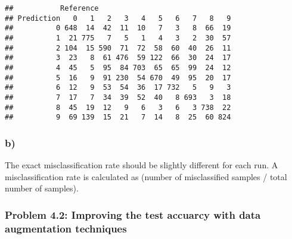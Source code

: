 \documentclass[
]{article}
\newenvironment{Shaded}{\begin{snugshade}}{\end{snugshade}}
\newcommand{\FunctionTok}[1]{\textcolor[rgb]{0.00,0.00,0.00}{#1}}
\newcommand{\NormalTok}[1]{#1}
\newcommand{\OtherTok}[1]{\textcolor[rgb]{0.56,0.35,0.01}{#1}}
\newcommand{\SpecialCharTok}[1]{\textcolor[rgb]{0.00,0.00,0.00}{#1}}
\begin{document}
\begin{Shaded}
\end{Shaded}

\begin{verbatim}
##           Reference
## Prediction   0   1   2   3   4   5   6   7   8   9
##          0 648  14  42  11  10   7   3   8  66  19
##          1  21 775   7   5   1   4   3   2  30  57
##          2 104  15 590  71  72  58  60  40  26  11
##          3  23   8  61 476  59 122  66  30  24  17
##          4  45   5  95  84 703  65  65  99  24  12
##          5  16   9  91 230  54 670  49  95  20  17
##          6  12   9  53  54  36  17 732   5   9   3
##          7  17   7  34  39  52  40   8 693   3  18
##          8  45  19  12   9   6   3   6   3 738  22
##          9  69 139  15  21   7  14   8  25  60 824
\end{verbatim}

\hypertarget{b-3}{%
\subsubsection{b)}\label{b-3}}

The exact misclassification rate should be slightly different for each
run. A misclassification rate is calculated as (number of misclassified
samples / total number of samples).

\hypertarget{problem-4.2-improving-the-test-accuarcy-with-data-augmentation-techniques}{%
\subsubsection{Problem 4.2: Improving the test accuarcy with data
augmentation
techniques}\label{problem-4.2-improving-the-test-accuarcy-with-data-augmentation-techniques}}
\end{document}
